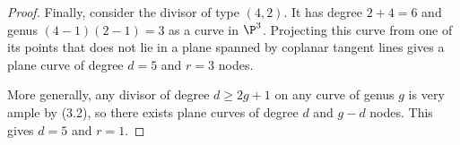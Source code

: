 \documentclass[a4paper]{article}
\begin{document}
\begin{enumerate} [label=\textbf{\arabic*.}, leftmargin=0em]
\begin{proof}
          Finally, consider the divisor of type $(4, 2)$.
          It has degree $2 + 4 = 6$ and genus $(4 - 1)(2 - 1) = 3$ as a curve in $\P^3$.
          Projecting this curve from one of its points that does not lie in a plane spanned by coplanar tangent lines gives a plane curve of degree $d = 5$ and $r = 3$ nodes.

          More generally, any divisor of degree $d \geq 2g + 1$ on any curve of genus $g$ is very ample by (3.2), so there exists plane curves of degree $d$ and $g - d$ nodes.
          This gives $d = 5$ and $r = 1$.

        \end{proof}

\end{enumerate}
\end{document}
